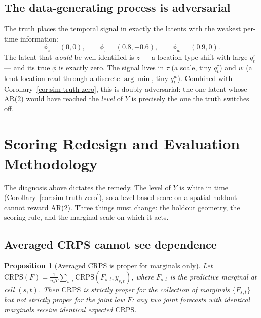 \documentclass[11pt]{article}
\newtheorem{proposition}{Proposition}
\theoremstyle{definition}
\begin{document}
\subsection{The data-generating process is adversarial}

The truth places the temporal signal in exactly the latents with the
weakest per-time information:
\begin{equation}
  \phi_z = (0, 0), \qquad
  \phi_\tau = (0.8, -0.6), \qquad
  \phi_w = (0.9, 0).
  \label{eq:adversarial}
\end{equation}
The latent that \emph{would} be well identified is $z$ --- a
location-type shift with large $q_t^z$ --- and its true $\phi$ is
exactly zero. The signal lives in $\tau$ (a scale, tiny $q_t^\tau$)
and $w$ (a knot location read through a discrete $\arg\min$, tiny
$q_t^w$). Combined with Corollary~\ref{cor:sim-truth-zero}, this is
doubly adversarial: the one latent whose AR(2) would have reached the
\emph{level} of $Y$ is precisely the one the truth switches off.

\section{Scoring Redesign and Evaluation Methodology}
\label{sec:redesign}

The diagnosis above dictates the remedy. The level of $Y$ is white in
time (Corollary~\ref{cor:sim-truth-zero}), so a level-based score on a
spatial holdout cannot reward AR(2). Three things must change: the
holdout geometry, the scoring rule, and the marginal scale on which it
acts.

\subsection{Averaged CRPS cannot see dependence}
\label{subsec:avg-crps}

\begin{proposition}[Averaged CRPS is proper for marginals only]
\label{prop:avg-crps}
Let $\overline{\mathrm{CRPS}}(F) = \tfrac{1}{n_s T}\sum_{s,t}
\mathrm{CRPS}(F_{s,t}, y_{s,t})$, where $F_{s,t}$ is the predictive
marginal at cell $(s,t)$. Then $\overline{\mathrm{CRPS}}$ is strictly
proper for the collection of marginals $\{F_{s,t}\}$ but \emph{not}
strictly proper for the joint law $F$: any two joint forecasts with
identical marginals receive identical expected
$\overline{\mathrm{CRPS}}$.
\end{proposition}
\end{document}
